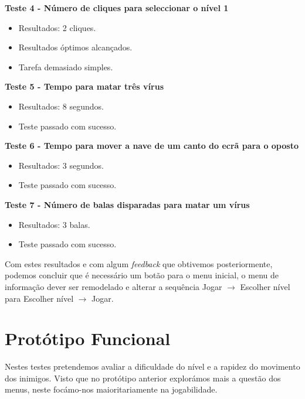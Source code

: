 \textbf{Teste 4 - Número de cliques para seleccionar o nível 1}

\begin{itemize}

\item Resultados: 2 cliques.

\item Resultados óptimos alcançados.

\item Tarefa demasiado simples.
\end{itemize}

\textbf{Teste 5 - Tempo para matar três vírus}

\begin{itemize}

\item Resultados: 8 segundos.

\item Teste passado com sucesso.
\end{itemize}

\textbf{Teste 6 - Tempo para mover a nave de um canto do ecrã para o oposto}

\begin{itemize}

\item Resultados: 3 segundos.

\item Teste passado com sucesso.
\end{itemize}

\textbf{Teste 7 - Número de balas disparadas para matar um vírus}

\begin{itemize}

\item Resultados: 3 balas.

\item Teste passado com sucesso.
\end{itemize}

Com estes resultados e com algum \textit{feedback} que obtivemos posteriormente, podemos concluir que é necessário um botão para o menu inicial, o menu de informação dever ser remodelado e alterar a sequência Jogar $\rightarrow$ Escolher nível para Escolher nível $\rightarrow$ Jogar.

\section{Protótipo Funcional}

Nestes testes pretendemos avaliar a dificuldade do nível e a rapidez do movimento dos inimigos. Visto que no protótipo anterior explorámos mais a questão dos menus, neste focámo-nos maioritariamente na jogabilidade.

